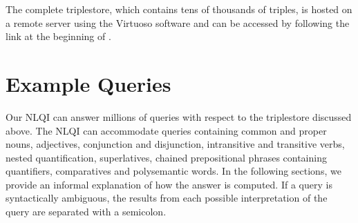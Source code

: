 \documentclass[../main.tex]{subfiles}
\begin{document}
\begin{refsection}
%
%
%
%
%
%
%
The complete triplestore, which contains tens of thousands of triples, is hosted on a remote server using the Virtuoso software \cite{virtuoso} and can be accessed by following the link at the beginning of .

\section{Example Queries}
\label{webist2019journal:examples}

Our NLQI can answer millions of queries with respect to the triplestore discussed above. The NLQI can accommodate queries containing common and proper nouns, adjectives, conjunction and disjunction, intransitive and transitive verbs, nested quantification, superlatives, chained prepositional phrases containing quantifiers, comparatives and polysemantic words. In the following sections, we provide an informal explanation of how the answer is computed.  If a query is syntactically ambiguous, the results from each possible interpretation of the query are separated with a semicolon.


\end{refsection}
\end{document}
